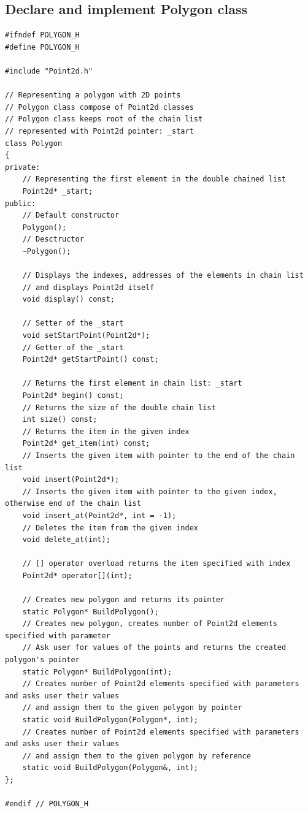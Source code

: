 \documentclass{article}
\begin{document}
	\subsection{Declare and implement Polygon class}
\begin{lstlisting}[label=Polygon,caption=Polygon.h]	
#ifndef POLYGON_H
#define POLYGON_H

#include "Point2d.h"

// Representing a polygon with 2D points
// Polygon class compose of Point2d classes
// Polygon class keeps root of the chain list
// represented with Point2d pointer: _start
class Polygon
{
private:
    // Representing the first element in the double chained list
    Point2d* _start;
public:
    // Default constructor
    Polygon();
    // Desctructor
    ~Polygon();

    // Displays the indexes, addresses of the elements in chain list
    // and displays Point2d itself
    void display() const;

    // Setter of the _start
    void setStartPoint(Point2d*);
    // Getter of the _start
    Point2d* getStartPoint() const;

    // Returns the first element in chain list: _start
    Point2d* begin() const;
    // Returns the size of the double chain list
    int size() const;
    // Returns the item in the given index
    Point2d* get_item(int) const;
    // Inserts the given item with pointer to the end of the chain list
    void insert(Point2d*);
    // Inserts the given item with pointer to the given index, otherwise end of the chain list
    void insert_at(Point2d*, int = -1);
    // Deletes the item from the given index
    void delete_at(int);

    // [] operator overload returns the item specified with index
    Point2d* operator[](int);

    // Creates new polygon and returns its pointer
    static Polygon* BuildPolygon();
    // Creates new polygon, creates number of Point2d elements specified with parameter
    // Ask user for values of the points and returns the created polygon's pointer
    static Polygon* BuildPolygon(int);
    // Creates number of Point2d elements specified with parameters and asks user their values
    // and assign them to the given polygon by pointer
    static void BuildPolygon(Polygon*, int);
    // Creates number of Point2d elements specified with parameters and asks user their values
    // and assign them to the given polygon by reference
    static void BuildPolygon(Polygon&, int);
};

#endif // POLYGON_H
\end{lstlisting}
\end{document}

